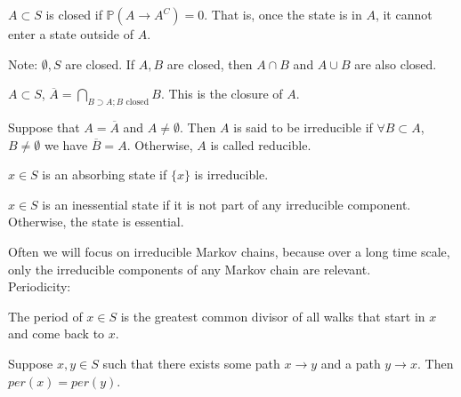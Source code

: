 \documentclass[english, course]{Notes}
\begin{document}
\begin{definition}
$A \subset S$ is closed if $\mathbb{P}(A \to A^C) = 0$. That is, once the state is in $A$, it cannot enter a state outside of $A$.\\
\end{definition}

\begin{remark}
Note: $\emptyset, S$ are closed. If $A, B$ are closed, then $A \cap B$ and $A \cup B$ are also closed.\\
\end{remark}

\begin{definition}
$A \subset S$, $\overline{A} = \bigcap_{B \supset A; B \text{ closed}} B$. This is the closure of $A$.\\
\end{definition}

\begin{definition}
Suppose that $A = \overline{A}$ and $A \neq \emptyset$. Then $A$ is said to be irreducible if $\forall B \subset A$, $B \neq \emptyset$ we have $\overline{B} = A$. Otherwise, $A$ is called reducible.\\
\end{definition}

\begin{definition}
$x \in S$ is an absorbing state if $\{x\}$ is irreducible.\\
\end{definition}

\begin{definition}
$x \in S$ is an inessential state if it is not part of any irreducible component. Otherwise, the state is essential.\\
\end{definition}

Often we will focus on irreducible Markov chains, because over a long time scale, only the irreducible components of any Markov chain are relevant.\\

Periodicity:

\begin{definition}
The period of $x \in S$ is the greatest common divisor of all walks that start in $x$ and come back to $x$.\\
\end{definition}

\begin{claim}
Suppose $x, y \in S$ such that there exists some path $x \to y$ and a path $y \to x$. Then $per(x) = per(y)$.
\end{claim}
\end{document}
